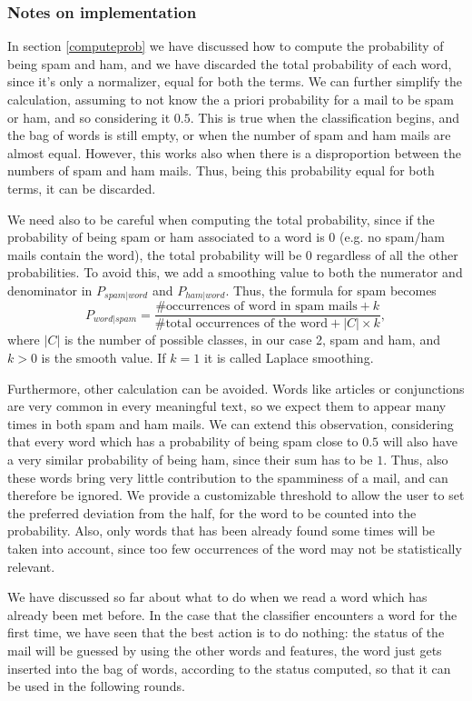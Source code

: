 \subsubsection{Notes on implementation}
\label{notesonimpl} In section \ref{computeprob} we have discussed how to compute the probability of being spam and ham, and we have discarded the total probability of each word, since it's only a normalizer, equal for both the terms. We can further simplify the calculation, assuming to not know the a priori probability for a mail to be spam or ham, and so considering it $0.5$. This is true when the classification begins, and the bag of words is still empty, or when the number of spam and ham mails are almost equal. However, this works also when there is a disproportion between the numbers of spam and ham mails. Thus, being this probability equal for both terms, it can be discarded.

We need also to be careful when computing the total probability, since if the probability of being spam or ham associated to a word is $0$ (e.g. no spam/ham mails contain the word), the total probability will be $0$ regardless of all the other probabilities. To avoid this, we add a smoothing value to both the numerator and denominator in $P_{spam|word}$ and $P_{ham|word}$. Thus, the formula for spam becomes $$P_{word|spam} = \frac{\mbox{\# occurrences of word in spam mails} + k}{\mbox{\# total occurrences of the word} + |C|\times k},$$ where $|C|$ is the number of possible classes, in our case 2, spam and ham, and $k > 0$ is the smooth value. If $k=1$ it is called Laplace smoothing.

Furthermore, other calculation can be avoided. Words like articles or conjunctions are very common in every meaningful text, so we expect them to appear many times in both spam and ham mails. We can extend this observation, considering that every word which has a probability of being spam close to $0.5$ will also have a very similar probability of being ham, since their sum has to be $1$. Thus, also these words bring very little contribution to the spamminess of a mail, and can therefore be ignored. We provide a customizable threshold to allow the user to set the preferred deviation from the half, for the word to be counted into the probability. Also, only words that has been already found some times will be taken into account, since too few occurrences of the word may not be statistically relevant.

We have discussed so far about what to do when we read a word which has already been met before. In the case that the classifier encounters a word for the first time, we have seen that the best action is to do nothing: the status of the mail will be guessed by using the other words and features, the word just gets inserted into the bag of words, according to the status computed, so that it can be used in the following rounds.
